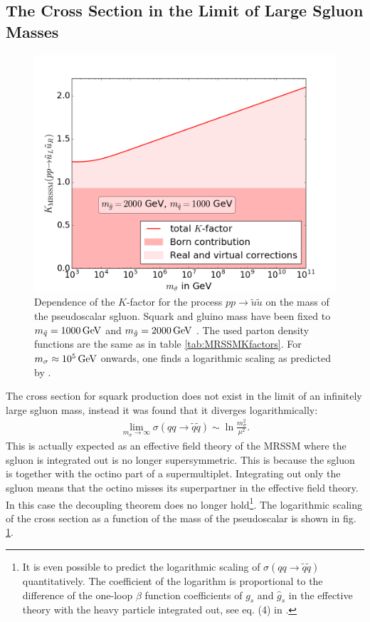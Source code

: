 \subsection{The Cross Section in the Limit of Large Sgluon Masses}
\begin{figure}[H]
\begin{center}
\includegraphics[scale=.5]{figures/MRSSM_uu_susu_Kfactors_msq=1000GeV_msg=2000GeV.png}
\caption{Dependence of the $K$-factor for the process $pp \to \tilde{u}\tilde{u}$ on the mass of the pseudoscalar sgluon. Squark and gluino mass have been fixed to $m_{\tilde{q}} = \unit[1000]{GeV}$ and $m_{\tilde{g}} = \unit[2000]{GeV}$ . The used parton density functions are the same as in table \ref{tab:MRSSMKfactors}. For $m_{\sigma} \approx \unit[10^5]{GeV}$ onwards, one finds a logarithmic scaling as predicted by \cite{Cheng:1997sq}.}\label{fig:SgluonMassDependence}
\end{center}
\end{figure}
The cross section for squark production does not exist in the limit of an infinitely large sgluon mass, instead it was found that it diverges logarithmically:
\begin{align}
\lim_{m_{\sigma}\to\infty} \sigma(qq \to \tilde{q}\tilde{q}) \sim \ln \frac{m_{\sigma}^2}{\mu^2}.
\end{align}
This is actually expected as an effective field theory of the MRSSM where the sgluon is integrated out is no longer supersymmetric. This is because the sgluon is together with the octino part of a supermultiplet. Integrating out only the sgluon means that the octino misses its superpartner in the effective field theory. In this case the decoupling theorem \cite{Appelquist:1974tg} does no longer hold\footnote{It is even possible to predict the  logarithmic scaling of $\sigma(qq \to \tilde{q}\tilde{q})$ quantitatively. The coefficient of the logarithm is proportional to the difference of the one-loop $\beta$ function coefficients of $g_s$ and $\hat{g}_s$ in the effective theory with the heavy particle integrated out, see eq. (4) in \cite{Cheng:1997sq}.}.
The logarithmic scaling of the cross section as a function of the mass of the pseudoscalar is shown in fig. \ref{fig:SgluonMassDependence}.


